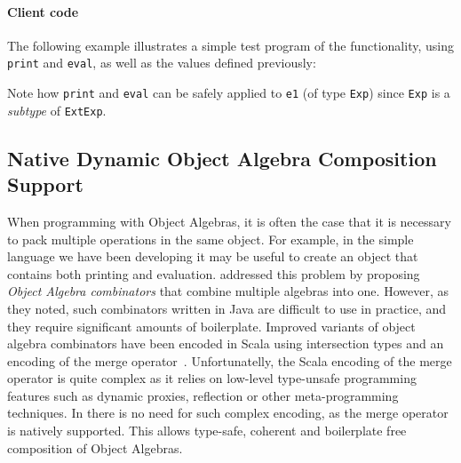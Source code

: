 \paragraph{Client code}
The following example illustrates a simple test program of the
functionality, using \lstinline{print} and \lstinline{eval}, as well
as the values defined previously:

\noindent Note how \lstinline{print} and \lstinline{eval} can be
safely applied to \lstinline{e1} (of type \lstinline{Exp}) since
\lstinline{Exp} is a \emph{subtype} of \lstinline{ExtExp}.

\subsection{Native Dynamic Object Algebra Composition Support}
\label{sec:dynamic}

When programming with Object Algebras, it is often the case that it is
necessary to pack multiple operations in the same object. For example, 
in the simple language we have been developing it may be useful to
create an object that contains both printing and evaluation.
\citet{oliveira2012extensibility} addressed this problem by proposing
\textit{Object Algebra combinators} that combine multiple algebras into one.
However, as they noted, such combinators written in Java are difficult to use in
practice, and they require significant amounts of boilerplate. 
Improved variants of object algebra combinators have been encoded in Scala using
intersection types and an encoding of the merge
operator~\cite{oliveira2013feature, rendel14attributes}. Unfortunatelly, the Scala
encoding of the merge operator is quite complex as it relies on low-level
type-unsafe programming features such as dynamic proxies, reflection or other
meta-programming techniques. In \name there is no need for such complex
encoding, as the merge operator is natively supported. This allows
type-safe, coherent and boilerplate free composition of Object Algebras.  

